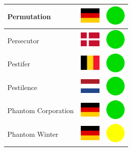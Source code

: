\documentclass[12pt, a4paper, twoside]{report}
\begin{document}
\begin{center}
\begin{longtable}{|p{5cm}|p{2cm}|p{2cm}|}
 Permutation                                                & \includegraphics[width=1cm]{../img/flags/de} &   \includegraphics[width=1cm]{../likes/y} \\ \hline
 Persecutor                                                 & \includegraphics[width=1cm]{../img/flags/dk} &   \includegraphics[width=1cm]{../likes/y} \\ \hline
 Pestifer                                                   & \includegraphics[width=1cm]{../img/flags/be} &   \includegraphics[width=1cm]{../likes/y} \\ \hline
 Pestilence                                                 & \includegraphics[width=1cm]{../img/flags/nl} &   \includegraphics[width=1cm]{../likes/y} \\ \hline
 Phantom Corporation                                        & \includegraphics[width=1cm]{../img/flags/de} &   \includegraphics[width=1cm]{../likes/y} \\ \hline
 Phantom Winter                                             & \includegraphics[width=1cm]{../img/flags/de} &   \includegraphics[width=1cm]{../likes/m} \\ \hline

\end{longtable}
\end{center}
\end{document}
